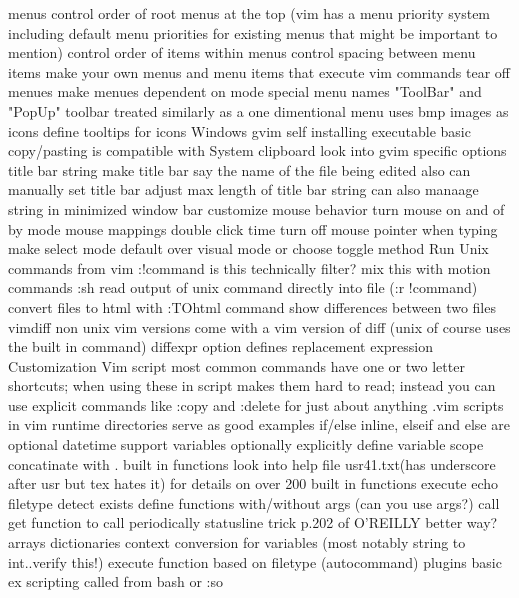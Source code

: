 \documentclass[12pt]{book}
\begin{document}
{{    menus
      control order of root menus at the top (vim has a menu priority system including default menu priorities for existing menus that might be important to mention)
      control order of items within menus
      control spacing between menu items
      make your own menus and menu items that execute vim commands
      tear off menues
      make menues dependent on mode
      special menu names "ToolBar" and "PopUp"
    toolbar
      treated similarly as a one dimentional menu
      uses bmp images as icons
      define tooltips for icons
    Windows gvim
      self installing executable
      basic copy/pasting is compatible with System clipboard
    look into gvim specific options
    title bar string
      make title bar say the name of the file being edited
      also can manually set title bar
      adjust max length of title bar string
      can also manaage string in minimized window bar
    customize mouse behavior
      turn mouse on and of by mode
      mouse mappings
      double click time
      turn off mouse pointer when typing
    make select mode default over visual mode or choose toggle method
  Run Unix commands from vim
    :!command
      is this technically filter?
      mix this with motion commands
    :sh
    read output of unix command directly into file (:r !command)
  convert files to html with :TOhtml command
  show differences between two files
    vimdiff
    non unix vim versions come with a vim version of diff (unix of course uses the built in command)
    diffexpr option defines replacement expression
Customization
  Vim script
    most common commands have one or two letter shortcuts; when using these in script makes them hard to read; instead you can use explicit commands like :copy and :delete for just about anything
    .vim scripts in vim runtime directories serve as good examples
    if/else
      inline, elseif and else are optional
    datetime support
    variables
      optionally explicitly define variable scope
    concatinate with .
    built in functions
      look into help file usr41.txt(has underscore after usr but tex hates it) for details on over 200 built in functions
      execute
      echo
      filetype detect
      exists
    define functions
      with/without args (can you use args?)
      call
    get function to call periodically
      statusline trick p.202 of O'REILLY
      better way?
    arrays
    dictionaries
    context conversion for variables (most notably string to int..verify this!)
    execute function based on filetype (autocommand)
    plugins
    basic ex scripting called from bash or :so
}}
\end{document}
